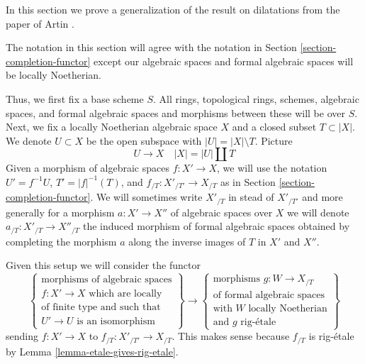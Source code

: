\noindent
In this section we prove a generalization of the result on dilatations
from the paper of Artin \cite{ArtinII}.

\medskip\noindent
The notation in this section will agree with the notation in
Section \ref{section-completion-functor} except our algebraic
spaces and formal algebraic spaces will be locally Noetherian.

\medskip\noindent
Thus, we first fix a base scheme $S$. All rings, topological rings,
schemes, algebraic spaces, and formal algebraic spaces and
morphisms between these will be over $S$. Next, we fix a
locally Noetherian algebraic space $X$ and a closed subset $T \subset |X|$.
We denote $U \subset X$ be the open subspace with $|U| = |X| \setminus T$.
Picture
$$
U \to X \quad |X| = |U| \amalg T
$$
Given a morphism of algebraic spaces $f : X' \to X$, we will use the notation
$U' = f^{-1}U$, $T' = |f|^{-1}(T)$, and $f_{/T} : X'_{/T'} \to X_{/T}$ as in
Section \ref{section-completion-functor}. We will sometimes write
$X'_{/T}$ in stead of $X'_{/T'}$ and more generally for a morphism
$a : X' \to X''$ of algebraic spaces over $X$ we will denote
$a_{/T} : X'_{/T} \to X''_{/T}$ the induced morphism of formal
algebraic spaces obtained by completing the morphism $a$ along
the inverse images of $T$ in $X'$ and $X''$.

\medskip\noindent
Given this setup we will consider the functor
\begin{equation}
\label{equation-completion-functor}
\left\{
\begin{matrix}
\text{morphisms of algebraic spaces}\\
f : X' \to X\text{ which are locally}\\
\text{of finite type and such that}\\
U' \to U\text{ is an isomorphism}
\end{matrix}
\right\}
\longrightarrow
\left\{
\begin{matrix}
\text{morphisms }g : W \to X_{/T}\\
\text{of formal algebraic spaces}\\
\text{with }W\text{ locally Noetherian}\\
\text{and }g\text{ rig-\'etale}
\end{matrix}
\right\}
\end{equation}
sending $f : X' \to X$ to $f_{/T} : X'_{/T'} \to X_{/T}$.
This makes sense because $f_{/T}$ is rig-\'etale by
Lemma \ref{lemma-etale-gives-rig-etale}.

